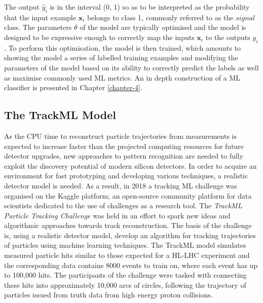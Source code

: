 The output $\hat{y}_i$ is in the interval (0, 1) so as to be interpreted as the probability that the input example $\textbf{x}_i$ belongs to class 1, commonly referred to as the $signal$ class. The parameters $\theta$ of the model are typically optimised and the model is designed to be expressive enough to correctly map the inputs $\textbf{x}_i$ to the outputs $y_i$. To perform this optimisation, the model is then trained, which amounts to showing the model a series of labelled training examples and modifying the parameters of the model based on its ability to correctly predict the labels as well as maximise commonly used ML metrics. An in depth construction of a ML classifier is presented in Chapter \ref{chapter-4}.

\subsection{The TrackML Model}
\label{trackml-detector}

As the CPU time to reconstruct particle trajectories from measurements is expected to increase faster than the projected computing resources for future detector upgrades, new approaches to pattern recognition are needed to fully exploit the discovery potential of modern silicon detectors. In order to acquire an environment for fast prototyping and developing various techniques, a realistic detector model is needed. As a result, in 2018 a tracking ML challenge was organised on the Kaggle platform; an open-source community platform for data scientists dedicated to the use of challenges as a research tool. The \textit{TrackML Particle Tracking Challenge} \cite{kaggle-trackml} was held in an effort to spark new ideas and algorithmic approaches towards track reconstruction. The basis of the challenge is, using a realistic detector model, develop an algorithm for tracking trajectories of particles using machine learning techniques. The TrackML model simulates measured particle hits similar to those expected for a HL-LHC experiment and the corresponding data contains 8000 events to train on, where each event has up to 100,000 hits. The participants of the challenge were tasked with connecting these hits into approximately 10,000 arcs of circles, following the trajectory of particles issued from truth data from high energy proton collisions. 

